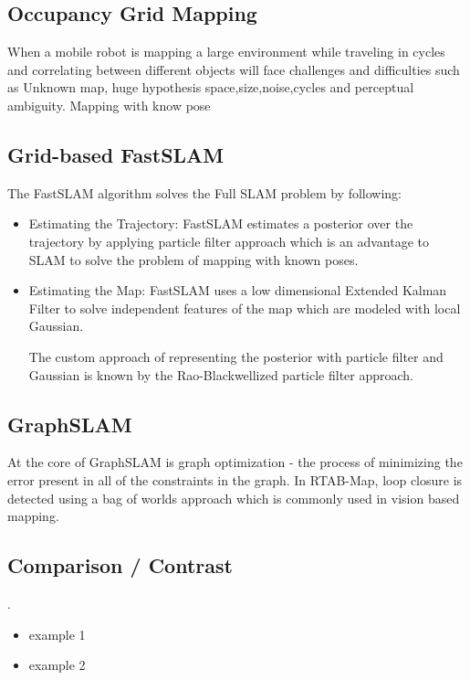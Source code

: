 \documentclass[10pt,journal,compsoc]{IEEEtran}
\begin{document}
\subsection{Occupancy Grid Mapping}
When a mobile robot is mapping a large environment while traveling in cycles and correlating between different objects will face challenges and difficulties such as Unknown map, huge hypothesis space,size,noise,cycles and perceptual ambiguity. Mapping with know pose

\subsection{Grid-based FastSLAM}
The FastSLAM algorithm solves the Full SLAM problem by following:
\begin{itemize}
\item Estimating the Trajectory: FastSLAM estimates a posterior over the trajectory by applying particle filter approach which is an advantage to SLAM to solve the problem of mapping with known poses.
\item Estimating the Map: FastSLAM uses a low dimensional Extended Kalman Filter to solve independent features of the map which are modeled with local Gaussian.

The custom approach of representing the posterior with particle filter and Gaussian is known by the Rao-Blackwellized particle filter approach.

\end {itemize}

\subsection{GraphSLAM}
At the core of GraphSLAM is graph optimization - the process of minimizing the error present in all of the constraints in the graph.
In RTAB-Map, loop closure is detected using a bag of worlds approach which is commonly used in vision based mapping.

\subsection{Comparison / Contrast}
. 

\begin{itemize}
\item example 1
\item example 2
\end {itemize}
\end{document}
